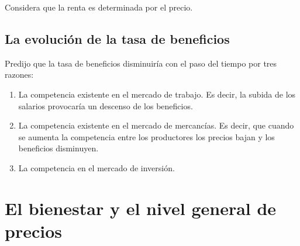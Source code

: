 \documentclass[10pt]{book}
\begin{document}
Considera que la renta es determinada por el precio.

\subsection*{La evolución de la tasa de beneficios}
Predijo que la tasa de beneficios disminuiría con el paso del tiempo por tres razones:
\begin{enumerate}[\bfseries (1)]
    \item La competencia existente en el mercado de trabajo. Es decir, la subida de los salarios provocaría un descenso de los beneficios.
    \item La competencia existente en el mercado de mercancías. Es decir, que cuando se aumenta la competencia entre los productores los precios bajan y los beneficios disminuyen.
    \item La competencia en el mercado de inversión. 
\end{enumerate}

\section*{El bienestar y el nivel general de precios}
\end{document}
